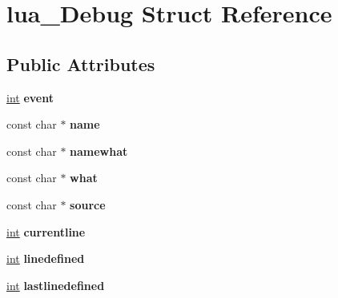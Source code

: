 \hypertarget{structlua__Debug}{}\section{lua\+\_\+\+Debug Struct Reference}
\label{structlua__Debug}
\subsection*{Public Attributes}
\begin{DoxyCompactItemize}
\item 
\hypertarget{structlua__Debug_a6578d385d2322429a0fe87b79f1ddec0}{}\hyperlink{SDL__thread_8h_a6a64f9be4433e4de6e2f2f548cf3c08e}{int} {\bfseries event}\label{structlua__Debug_a6578d385d2322429a0fe87b79f1ddec0}

\item 
\hypertarget{structlua__Debug_a2978ab7f2ade479a003beb16d3b7a993}{}const char $\ast$ {\bfseries name}\label{structlua__Debug_a2978ab7f2ade479a003beb16d3b7a993}

\item 
\hypertarget{structlua__Debug_a7e8c201950ea4dd3f2c7df9e1201019a}{}const char $\ast$ {\bfseries namewhat}\label{structlua__Debug_a7e8c201950ea4dd3f2c7df9e1201019a}

\item 
\hypertarget{structlua__Debug_afbf8df5f26e9c345378a7eb402eed081}{}const char $\ast$ {\bfseries what}\label{structlua__Debug_afbf8df5f26e9c345378a7eb402eed081}

\item 
\hypertarget{structlua__Debug_a422bceba8605d96bce4d19ce801a62e4}{}const char $\ast$ {\bfseries source}\label{structlua__Debug_a422bceba8605d96bce4d19ce801a62e4}

\item 
\hypertarget{structlua__Debug_a97b3ed36cdfdc6f2c694b253a3d96da6}{}\hyperlink{SDL__thread_8h_a6a64f9be4433e4de6e2f2f548cf3c08e}{int} {\bfseries currentline}\label{structlua__Debug_a97b3ed36cdfdc6f2c694b253a3d96da6}

\item 
\hypertarget{structlua__Debug_a97cb69b18daa46d20fb1a13eec78661b}{}\hyperlink{SDL__thread_8h_a6a64f9be4433e4de6e2f2f548cf3c08e}{int} {\bfseries linedefined}\label{structlua__Debug_a97cb69b18daa46d20fb1a13eec78661b}

\item 
\hypertarget{structlua__Debug_a4c69b9d30e54cf9071cd2987ede128eb}{}\hyperlink{SDL__thread_8h_a6a64f9be4433e4de6e2f2f548cf3c08e}{int} {\bfseries lastlinedefined}\label{structlua__Debug_a4c69b9d30e54cf9071cd2987ede128eb}


\end{DoxyCompactItemize}
